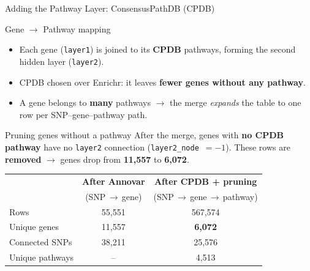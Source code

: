 \documentclass[aspectratio=169]{beamer}
\begin{document}
\begin{frame}{Adding the Pathway Layer: ConsensusPathDB (CPDB)}
    \small
    \begin{block}{Gene $\rightarrow$ Pathway mapping}
        \begin{itemize}
            \item Each gene (\texttt{layer1}) is joined to its \textbf{CPDB} pathways, forming the second hidden layer (\texttt{layer2}).
            \item CPDB chosen over Enrichr: it leaves \textbf{fewer genes without any pathway}.
            \item A gene belongs to \textbf{many} pathways $\rightarrow$ the merge \emph{expands} the table to one row per SNP--gene--pathway path.
        \end{itemize}
    \end{block}

    \begin{block}{Pruning genes without a pathway}
        \small
        After the merge, genes with \textbf{no CPDB pathway} have no \texttt{layer2} connection
        (\texttt{layer2\_node}~$=-1$). These rows are \textbf{removed} $\rightarrow$ genes drop from
        \textbf{11{,}557} to \textbf{6{,}072}.
    \end{block}

    \centering
    \scriptsize
    \renewcommand{\arraystretch}{1.2}
    \begin{tabular}{l c c}
        \toprule
        & \textbf{After Annovar} & \textbf{After CPDB + pruning} \\
        & (SNP\,$\rightarrow$\,gene) & (SNP\,$\rightarrow$\,gene\,$\rightarrow$\,pathway) \\
        \midrule
        Rows            & 55{,}551 & 567{,}574 \\
        Unique genes    & 11{,}557 & \textbf{6{,}072} \\
        Connected SNPs  & 38{,}211 & 25{,}576 \\
        Unique pathways & --       & 4{,}513 \\
        \bottomrule
    \end{tabular}
\end{frame}
\end{document}
